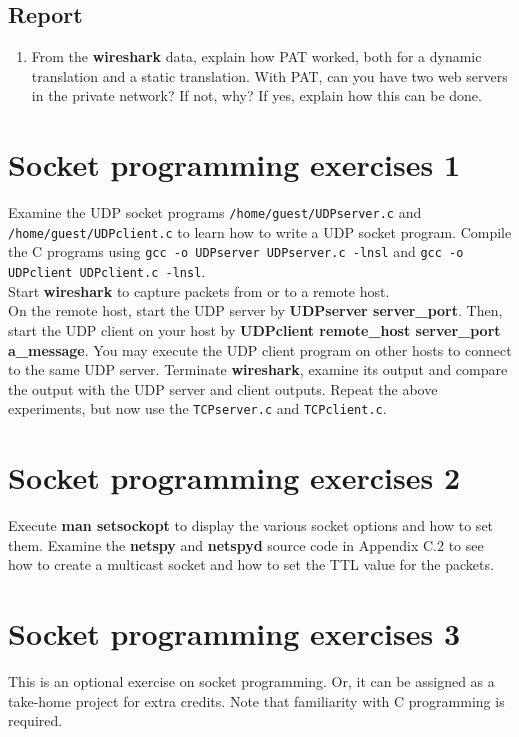 \documentclass[10pt,a4paper]{article}
\numberwithin{equation}{section}
\numberwithin{figure}{section}
\numberwithin{table}{section}
\begin{document}
    \subsection*{Report}
    \begin{enumerate}
        \item From the \textbf{wireshark} data, explain how PAT worked, both for a dynamic translation and a static translation.
        With PAT, can you have two web servers in the private network?
        If not, why?
        If yes, explain how this can be done.
    \end{enumerate}

\iffalse
    \section*{Socket programming exercises 1}
    Examine the UDP socket programs \texttt{/home/guest/UDPserver.c} and \texttt{/home/guest/UDPclient.c} to learn how to write a UDP socket program.
    Compile the C programs using \texttt{gcc -o UDPserver UDPserver.c -lnsl} and \texttt{gcc -o UDPclient UDPclient.c -lnsl}. \\
    Start \textbf{wireshark} to capture packets from or to a remote host. \\
    On the remote host, start the UDP server by \textbf{UDPserver server\_port}.
    Then, start the UDP client on your host by \textbf{UDPclient remote\_host server\_port a\_message}.
    You may execute the UDP client program on other hosts to connect to the same UDP server.
    Terminate \textbf{wireshark}, examine its output and compare the output with the UDP server and client outputs.
    Repeat the above experiments, but now use the \texttt{TCPserver.c} and \texttt{TCPclient.c}.

    \section*{Socket programming exercises 2}
    Execute \textbf{man setsockopt} to display the various socket options and how to set them.
    Examine the \textbf{netspy} and \textbf{netspyd} source code in Appendix C.2 to see how to create a multicast socket and how to set the TTL value for the packets.

    \section*{Socket programming exercises 3}
    This is an optional exercise on socket programming.
    Or, it can be assigned as a take-home project for extra credits.
    Note that familiarity with C programming is required.
\end{document}
